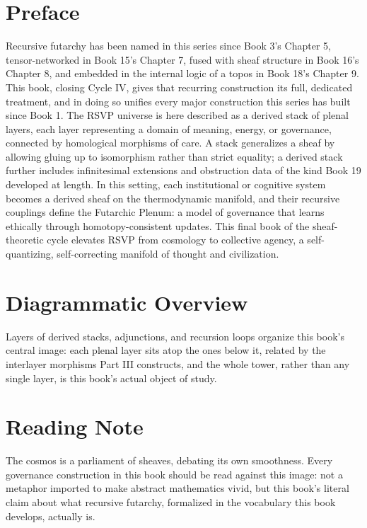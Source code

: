 \chapter*{Preface}

Recursive futarchy has been named in this series since Book 3's Chapter 5, tensor-networked in Book 15's Chapter 7, fused with sheaf structure in Book 16's Chapter 8, and embedded in the internal logic of a topos in Book 18's Chapter 9. This book, closing Cycle IV, gives that recurring construction its full, dedicated treatment, and in doing so unifies every major construction this series has built since Book 1. The RSVP universe is here described as a derived stack of plenal layers, each layer representing a domain of meaning, energy, or governance, connected by homological morphisms of care. A stack generalizes a sheaf by allowing gluing up to isomorphism rather than strict equality; a derived stack further includes infinitesimal extensions and obstruction data of the kind Book 19 developed at length. In this setting, each institutional or cognitive system becomes a derived sheaf on the thermodynamic manifold, and their recursive couplings define the Futarchic Plenum: a model of governance that learns ethically through homotopy-consistent updates. This final book of the sheaf-theoretic cycle elevates RSVP from cosmology to collective agency, a self-quantizing, self-correcting manifold of thought and civilization.

\chapter*{Diagrammatic Overview}

Layers of derived stacks, adjunctions, and recursion loops organize this book's central image: each plenal layer sits atop the ones below it, related by the interlayer morphisms Part III constructs, and the whole tower, rather than any single layer, is this book's actual object of study.

\chapter*{Reading Note}

The cosmos is a parliament of sheaves, debating its own smoothness. Every governance construction in this book should be read against this image: not a metaphor imported to make abstract mathematics vivid, but this book's literal claim about what recursive futarchy, formalized in the vocabulary this book develops, actually is.

